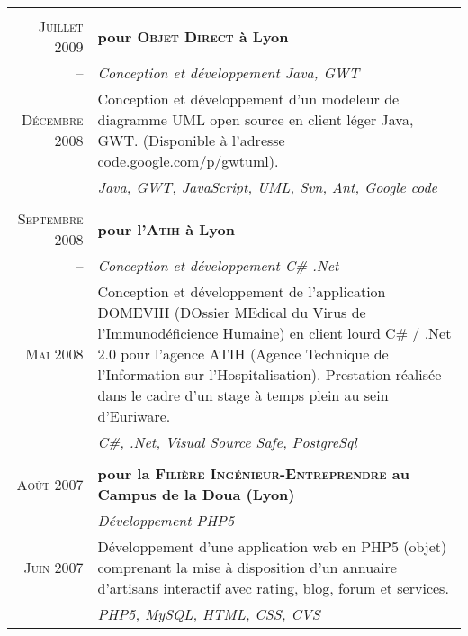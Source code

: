 \documentclass[a4paper,10pt]{article}
\begin{document}
\begin{supertabular}{r|p{11cm}}
     \\
    \textsc{Juillet} 2009 & \textbf{pour \textsc{Objet Direct} à Lyon} \\
    -- & \emph{Conception et développement Java, GWT} \\
    \footnotesize{\textsc{Décembre} 2008}& \footnotesize{Conception et développement d’un modeleur de diagramme UML open source en client léger Java, GWT. (Disponible à l’adresse \href{http://code.google.com/p/gwtuml/}{code.google.com/p/gwtuml}).} \\
    & \emph{Java, GWT, JavaScript, UML, Svn, Ant, Google code} \\


     \\
    \textsc{Septembre} 2008 & \textbf{pour l’\textsc{Atih} à Lyon} \\
    -- & \emph{Conception et développement C\# .Net} \\
    \footnotesize{\textsc{Mai} 2008} & \footnotesize{Conception et développement de l’application DOMEVIH (DOssier MEdical du Virus de l’Immunodéficience Humaine) en client lourd C\# / .Net 2.0 pour l’agence ATIH (Agence Technique de l’Information sur l’Hospitalisation). Prestation réalisée dans le cadre d’un stage à temps plein au sein d’Euriware.} \\
    & \emph{C\#, .Net, Visual Source Safe, PostgreSql} \\


     \\
    \textsc{Août} 2007 & \textbf{pour la \textsc{Filière Ingénieur-Entreprendre} au Campus de la Doua (Lyon)} \\
    -- & \emph{Développement PHP5} \\
    \footnotesize{\textsc{Juin} 2007} & \footnotesize{Développement d’une application web en PHP5 (objet) comprenant la mise à disposition d’un annuaire d’artisans interactif avec rating, blog, forum et services.} \\
    & \emph{PHP5, MySQL, HTML, CSS, CVS} \\

  \end{supertabular} \\
\end{document}
